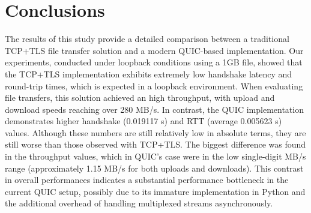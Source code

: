 \section{Conclusions}
The results of this study provide a detailed comparison between a traditional TCP+TLS file transfer solution and a modern QUIC-based implementation. Our experiments, conducted under loopback conditions using a 1GB file, showed that the TCP+TLS implementation exhibits extremely low handshake latency and round-trip times, which is expected in a loopback environment. When evaluating file transfers, this solution achieved an high throughput, with upload and download speeds reaching over 280 MB/s. In contrast, the QUIC implementation demonstrates higher handshake (0.019117 s) and RTT (average 0.005623 s) values. Although these numbers are still relatively low in absolute terms, they are still worse than those observed with TCP+TLS. The biggest difference was found in the throughput values, which in QUIC's case were in the low single-digit MB/s range (approximately 1.15 MB/s for both uploads and downloads). This contrast in overall performances indicates a substantial performance bottleneck in the current QUIC setup, possibly due to its immature implementation in Python and the additional overhead of handling multiplexed streams asynchronously.